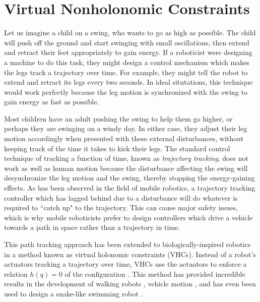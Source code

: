 \section{Virtual Nonholonomic Constraints}
Let us imagine a child on a swing, who wants to go as high as possible. The
child will push off the ground and start swinging with small oscillations,
then extend and retract their feet appropriately to gain energy. 
If a roboticist were designing a machine to do this task, they might design a
control mechanism which makes the legs track a trajectory over time. For
example, they might tell the robot to extend and retract its legs every two
seconds. In ideal situtations, this technique would work perfectly because the
leg motion is synchronized with the swing to gain energy as fast as possible.

Most children have an adult pushing the swing to help them go higher, or perhaps
they are swinging on a windy day. In either case, they adjust their leg
motion accordingly when presented with these external disturbances, without
keeping track of the time it takes to kick their legs. The
standard control technique of tracking a function of time, known as
\textit{trajectory tracking}, does not work as well as human motion 
because the disturbance affecting the swing will desynchronize the leg motion
and the swing, thereby stopping the energy-gaining effects. 
As has been observed in the field of mobile robotics,
a trajectory tracking controller which has lagged behind due to a disturbance
will do whatever is required to ``catch up" to
the trajectory. This can cause major safety issues, which is why mobile
roboticists prefer to design controllers which drive a vehicle towards a path in
space rather than a trajectory in time.

This path tracking approach has been extended to biologically-inspired robotics
in a method known as virtual holonomic constraints (VHCs).
Instead of a robot's actuators tracking
a trajectory over time, VHCs use the actuators to enforce a relation
\(h(q) = 0\) of the configuration \cite{vhcs_for_el_systems}. 
This method has provided incredible results in the development of 
walking robots \cite{vhc_robotic_walking, vhc_stable_walking}, 
vehicle motion \cite{vhc_bicycle, vhc_helicopter}, 
and has even been used to design a snake-like swimming robot
\cite{vhc_snake}.

